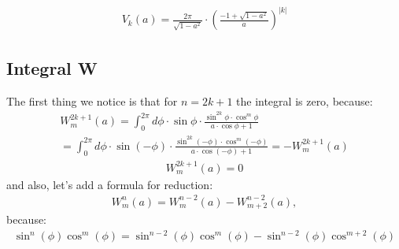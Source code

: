 \begin{equation}\begin{aligned}
V_k(a) = \frac{2\pi}{\sqrt{1 - a^2}} \cdot \left(\frac{-1 + \sqrt{1 - a^2}}{a}\right)^{|k|}
\end{aligned}\end{equation}

\subsection{Integral W}
The first thing we notice is that for $n = 2k+1$ the integral is zero, because:
\begin{equation*}\begin{aligned}
W_m^{2k+1}(a) = \int_{0}^{2 \pi} d \phi \cdot \sin \phi \cdot \frac{\sin^{2k} \phi \cdot \cos^m \phi}{a\cdot \cos \phi + 1} \\=  \int_{0}^{2 \pi} d \phi \cdot \sin (-\phi) \cdot \frac{\sin^{2k}(-\phi) \cdot \cos^m (-\phi)}{a\cdot \cos (-\phi) + 1} = - W_m^{2k+1}(a)
\end{aligned}\end{equation*}
\begin{equation}\begin{aligned}
W_m^{2k+1}(a) = 0
\end{aligned}\end{equation}
and also, let's add a formula for reduction:
\begin{equation}\begin{aligned}
W_m^{n}(a) = W_m^{n-2}(a) - W_{m+2}^{n-2}(a),
\end{aligned}\end{equation}
because:
\begin{equation}\begin{aligned}
\sin^n(\phi) \cos^m(\phi) =  \sin^{n-2}(\phi) \cos^m(\phi) - \sin^{n-2}(\phi) \cos^{m+2}(\phi)  
\end{aligned}\end{equation}

